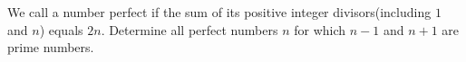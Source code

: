 We call a number perfect if the sum of its positive integer divisors(including $1$ and $n$) equals $2n$. Determine all perfect numbers $n$ for which $n-1$ and $n+1$ are prime numbers.